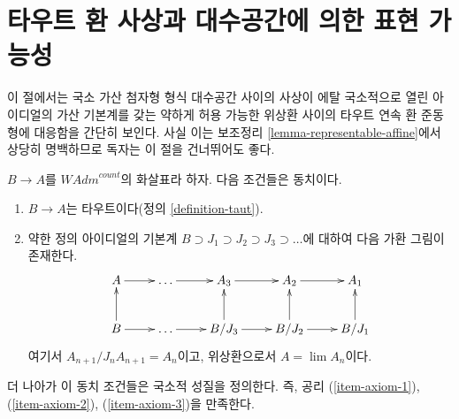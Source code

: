 \section{타우트 환 사상과 대수공간에 의한 표현 가능성}
\label{section-taut}

\noindent
이 절에서는 국소 가산 첨자형 형식 대수공간 사이의 사상이 에탈
국소적으로 열린 아이디얼의 가산 기본계를 갖는 약하게 허용 가능한
위상환 사이의 타우트 연속 환 준동형에 대응함을 간단히 보인다.
사실 이는 보조정리 \ref{lemma-representable-affine}에서 상당히
명백하므로 독자는 이 절을 건너뛰어도 좋다.

\begin{lemma}
\label{lemma-representable-property-rings}
$B \to A$를 $\textit{WAdm}^{count}$의 화살표라 하자. 다음 조건들은
동치이다.
\begin{enumerate}
\item[(a)] $B \to A$는 타우트이다(정의 \ref{definition-taut}).
\item[(b)] 약한 정의 아이디얼의 기본계
$B \supset J_1 \supset J_2 \supset J_3 \supset \ldots$에 대하여
다음 가환 그림이 존재한다. %
$$
\xymatrix{
A \ar[r] & \ldots \ar[r] & A_3 \ar[r] & A_2 \ar[r] & A_1 \\
B \ar[r] \ar[u] & \ldots \ar[r] & B/J_3 \ar[r] \ar[u] &
B/J_2 \ar[r] \ar[u] & B/J_1 \ar[u]
}
$$
여기서 $A_{n + 1}/J_nA_{n + 1} = A_n$이고, 위상환으로서
$A = \lim A_n$이다. %
\end{enumerate}
더 나아가 이 동치 조건들은 국소적 성질을 정의한다. 즉, 공리
(\ref{item-axiom-1}), (\ref{item-axiom-2}),
(\ref{item-axiom-3})을 만족한다.
\end{lemma}

